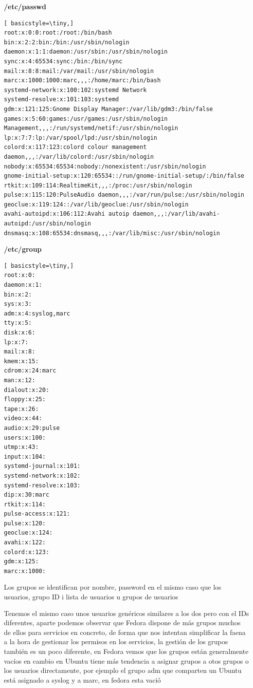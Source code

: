\documentclass[preprint,11pt]{elsarticle}
\begin{document}
\textbf{/etc/passwd}
\begin{lstlisting}[ basicstyle=\tiny,]
root:x:0:0:root:/root:/bin/bash
bin:x:2:2:bin:/bin:/usr/sbin/nologin
daemon:x:1:1:daemon:/usr/sbin:/usr/sbin/nologin
sync:x:4:65534:sync:/bin:/bin/sync
mail:x:8:8:mail:/var/mail:/usr/sbin/nologin
marc:x:1000:1000:marc,,,:/home/marc:/bin/bash
systemd-network:x:100:102:systemd Network
systemd-resolve:x:101:103:systemd
gdm:x:121:125:Gnome Display Manager:/var/lib/gdm3:/bin/false
games:x:5:60:games:/usr/games:/usr/sbin/nologin
Management,,,:/run/systemd/netif:/usr/sbin/nologin
lp:x:7:7:lp:/var/spool/lpd:/usr/sbin/nologin
colord:x:117:123:colord colour management daemon,,,:/var/lib/colord:/usr/sbin/nologin
nobody:x:65534:65534:nobody:/nonexistent:/usr/sbin/nologin
gnome-initial-setup:x:120:65534::/run/gnome-initial-setup/:/bin/false
rtkit:x:109:114:RealtimeKit,,,:/proc:/usr/sbin/nologin
pulse:x:115:120:PulseAudio daemon,,,:/var/run/pulse:/usr/sbin/nologin
geoclue:x:119:124::/var/lib/geoclue:/usr/sbin/nologin
avahi-autoipd:x:106:112:Avahi autoip daemon,,,:/var/lib/avahi-autoipd:/usr/sbin/nologin
dnsmasq:x:108:65534:dnsmasq,,,:/var/lib/misc:/usr/sbin/nologin
\end{lstlisting}



\textbf{/etc/group}
\begin{multicols}{2}
\begin{lstlisting}[ basicstyle=\tiny,]
root:x:0:
daemon:x:1:
bin:x:2:
sys:x:3:
adm:x:4:syslog,marc
tty:x:5:
disk:x:6:
lp:x:7:
mail:x:8:
kmem:x:15:
cdrom:x:24:marc
man:x:12:
dialout:x:20:
floppy:x:25:
tape:x:26:
video:x:44:
audio:x:29:pulse
users:x:100:
utmp:x:43:
input:x:104:
systemd-journal:x:101:
systemd-network:x:102:
systemd-resolve:x:103:
dip:x:30:marc
rtkit:x:114:
pulse-access:x:121:
pulse:x:120:
geoclue:x:124:
avahi:x:122:
colord:x:123:
gdm:x:125:
marc:x:1000:
\end{lstlisting}
Los grupos se identifican por nombre, password en el mismo caso que los usuarios, grupo ID i lista de usuarios u grupos de usuarios\medskip

Tenemos el mismo caso unos usuarios genéricos similares a los dos pero con el IDs diferentes, aparte podemos observar que Fedora dispone de más grupos muchos de ellos para servicios en concreto, de forma que nos intentan simplificar la faena a la hora de gestionar los permisos en los servicios, la gestión de los grupos también es un poco diferente, en Fedora vemos que los grupos están generalmente vacíos en cambio en Ubuntu tiene más tendencia a asignar grupos a otos grupos o los usuarios directamente, por ejemplo el grupo adm que comparten un Ubuntu está asignado a syslog y a marc, en fedora esta vació
\end{multicols}
\end{document}
